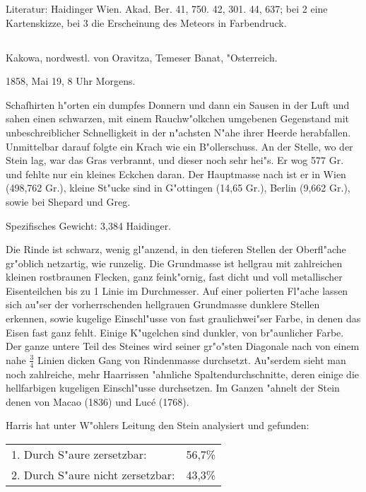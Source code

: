 \documentclass[a4paper, 11pt, oneside]{article}
\begin{document}
\normalsize
Literatur: Haidinger Wien. Akad. Ber. 41, 750. 42, 301. 44, 637; bei 2 eine Kartenskizze, bei 3 die Erscheinung des Meteors in Farbendruck.

\subsection{}
\LARGE
\paragraph{}
Kakowa, nordwestl. von Oravitza, Temeser Banat, "Osterreich.

1858, Mai 19, 8 Uhr Morgens.

Schafhirten h"orten ein dumpfes Donnern und dann ein Sausen in der Luft und sahen einen schwarzen, mit einem Rauchw"olkchen umgebenen Gegenstand mit unbeschreiblicher Schnelligkeit in der n"achsten N"ahe ihrer Heerde herabfallen. Unmittelbar darauf folgte ein Krach wie ein B"ollerschuss. An der Stelle, wo der Stein lag, war das Gras verbrannt, und dieser noch sehr hei"s. Er wog 577 Gr. und fehlte nur ein kleines Eckchen daran. Der Hauptmasse nach ist er in Wien (498,762 Gr.), kleine St"ucke sind in G"ottingen (14,65 Gr.), Berlin (9,662 Gr.), sowie bei Shepard und Greg.

Spezifisches Gewicht: 3,384 Haidinger.

Die Rinde ist schwarz, wenig gl"anzend, in den tieferen Stellen der Oberfl"ache gr"oblich netzartig, wie runzelig. Die Grundmasse ist hellgrau mit zahlreichen kleinen rostbraunen Flecken, ganz feink"ornig, fast dicht und voll metallischer Eisenteilchen bis zu 1 Linie im Durchmesser. Auf einer polierten Fl"ache lassen sich au"ser der vorherrschenden hellgrauen Grundmasse dunklere Stellen erkennen, sowie kugelige Einschl"usse von fast graulichwei"ser Farbe, in denen das Eisen fast ganz fehlt. Einige K"ugelchen sind dunkler, von br"aunlicher Farbe. Der ganze untere Teil des Steines wird seiner gr"o"sten Diagonale nach von einem nahe $\mathfrak{\frac{3}{4}}$ Linien dicken Gang von Rindenmasse durchsetzt. Au"serdem sieht man noch zahlreiche, mehr Haarrissen "ahnliche Spaltendurchschnitte, deren einige die hellfarbigen kugeligen Einschl"usse durchsetzen. Im Ganzen "ahnelt der Stein denen von Macao (1836) und Lucé (1768).

Harris hat unter W"ohlers Leitung den Stein analysiert und gefunden:
\begin{table}[H]
    \centering\swabfamily\Large
    \begin{tabular}{l r}
        1. Durch S"aure zersetzbar: & 56,7\% \\
        2. Durch S"aure nicht zersetzbar: & 43,3\% \\
    \end{tabular}
\end{table}
\end{document}
